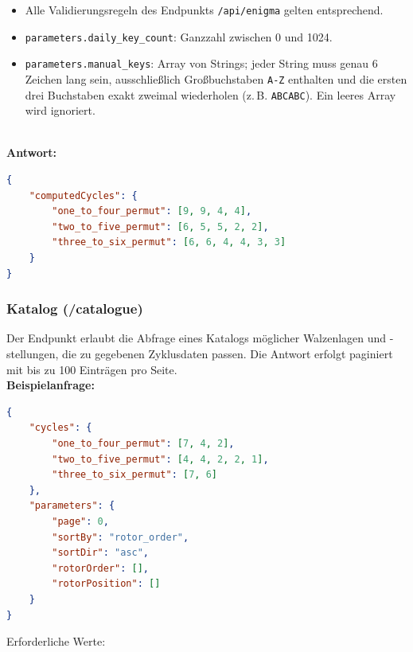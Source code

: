 \documentclass[12pt, ngerman, a4paper, numbers=noenddot]{article}
\begin{document}
\begin{itemize}
	\item Alle Validierungsregeln des Endpunkts \lstinline|/api/enigma| gelten entsprechend.
	\item \lstinline|parameters.daily_key_count|: Ganzzahl zwischen 0 und 1024.
	\item \lstinline|parameters.manual_keys|: Array von Strings; jeder String muss genau 6 Zeichen lang sein, ausschließlich Großbuchstaben \lstinline|A-Z| enthalten und die ersten drei Buchstaben exakt zweimal wiederholen (z.\,B. \lstinline|ABCABC|). Ein leeres Array wird ignoriert.
\end{itemize}
\ \\
\textbf{Antwort:}
\begin{lstlisting}[language=json, caption={Antwort auf /cyclometer-Anfrage}]
{
	"computedCycles": {
		"one_to_four_permut": [9, 9, 4, 4],
		"two_to_five_permut": [6, 5, 5, 2, 2],
		"three_to_six_permut": [6, 6, 4, 4, 3, 3]
	}
}
\end{lstlisting}



\subsubsection{Katalog (/catalogue)}

Der Endpunkt erlaubt die Abfrage eines Katalogs möglicher Walzenlagen und -stellungen, die zu gegebenen Zyklusdaten passen. Die Antwort erfolgt paginiert mit bis zu 100 Einträgen pro Seite.
\ \\
\textbf{Beispielanfrage:}
\begin{lstlisting}[language=json, caption={Gültige Anfrage an /catalogue}]
{
	"cycles": {
		"one_to_four_permut": [7, 4, 2],
		"two_to_five_permut": [4, 4, 2, 2, 1],
		"three_to_six_permut": [7, 6]
	},
	"parameters": {
		"page": 0,
		"sortBy": "rotor_order",
		"sortDir": "asc",
		"rotorOrder": [],
		"rotorPosition": []
	}
}
\end{lstlisting}
Erforderliche Werte:
\end{document}
